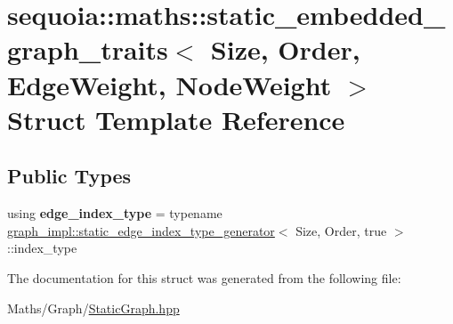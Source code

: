 \hypertarget{structsequoia_1_1maths_1_1static__embedded__graph__traits}{}\section{sequoia\+::maths\+::static\+\_\+embedded\+\_\+graph\+\_\+traits$<$ Size, Order, Edge\+Weight, Node\+Weight $>$ Struct Template Reference}
\label{structsequoia_1_1maths_1_1static__embedded__graph__traits}
\subsection*{Public Types}
\begin{DoxyCompactItemize}
\item 
\mbox{\label{structsequoia_1_1maths_1_1static__embedded__graph__traits_afc710ae4addced0e92a84b1ecd638075}} 
using {\bfseries edge\+\_\+index\+\_\+type} = typename \mbox{\hyperlink{structsequoia_1_1maths_1_1graph__impl_1_1static__edge__index__type__generator}{graph\+\_\+impl\+::static\+\_\+edge\+\_\+index\+\_\+type\+\_\+generator}}$<$ Size, Order, true $>$\+::index\+\_\+type
\end{DoxyCompactItemize}


The documentation for this struct was generated from the following file\+:\begin{DoxyCompactItemize}
\item 
Maths/\+Graph/\mbox{\hyperlink{_static_graph_8hpp}{Static\+Graph.\+hpp}}\end{DoxyCompactItemize}

